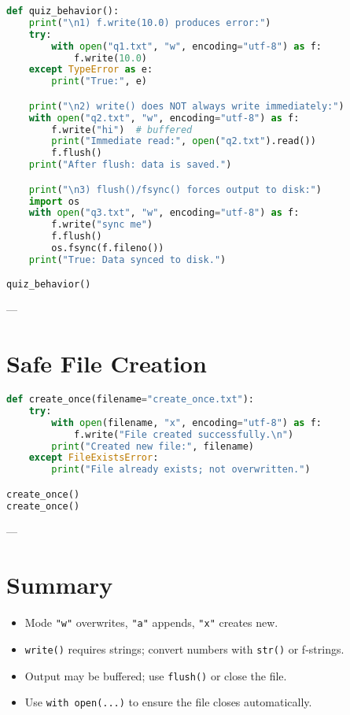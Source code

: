 \begin{lstlisting}[language=Python, caption={Mini-quiz code with real behavior.}]
def quiz_behavior():
    print("\n1) f.write(10.0) produces error:")
    try:
        with open("q1.txt", "w", encoding="utf-8") as f:
            f.write(10.0)
    except TypeError as e:
        print("True:", e)

    print("\n2) write() does NOT always write immediately:")
    with open("q2.txt", "w", encoding="utf-8") as f:
        f.write("hi")  # buffered
        print("Immediate read:", open("q2.txt").read())
        f.flush()
    print("After flush: data is saved.")

    print("\n3) flush()/fsync() forces output to disk:")
    import os
    with open("q3.txt", "w", encoding="utf-8") as f:
        f.write("sync me")
        f.flush()
        os.fsync(f.fileno())
    print("True: Data synced to disk.")

quiz_behavior()
\end{lstlisting}

---

\section{Safe File Creation}

\begin{lstlisting}[language=Python, caption={Use 'x' mode to avoid accidental overwrite.}]
def create_once(filename="create_once.txt"):
    try:
        with open(filename, "x", encoding="utf-8") as f:
            f.write("File created successfully.\n")
        print("Created new file:", filename)
    except FileExistsError:
        print("File already exists; not overwritten.")

create_once()
create_once()
\end{lstlisting}

---

\section*{Summary}
\begin{itemize}
  \item Mode \texttt{"w"} overwrites, \texttt{"a"} appends, \texttt{"x"} creates new.
  \item \texttt{write()} requires strings; convert numbers with \texttt{str()} or f-strings.
  \item Output may be buffered; use \texttt{flush()} or close the file.
  \item Use \texttt{with open(...)} to ensure the file closes automatically.
\end{itemize}
